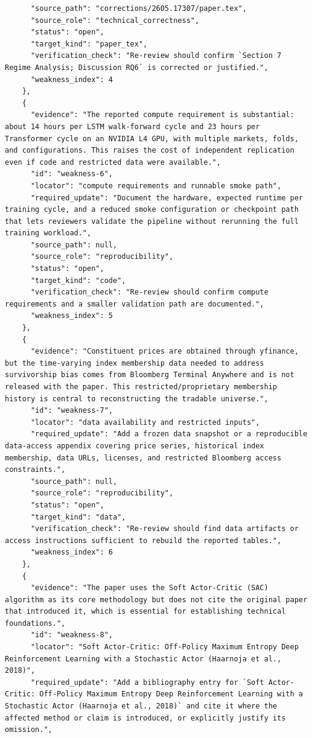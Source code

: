 \documentclass[11pt]{article}
\begin{document}
\begin{verbatim}
      "source_path": "corrections/2605.17307/paper.tex",
      "source_role": "technical_correctness",
      "status": "open",
      "target_kind": "paper_tex",
      "verification_check": "Re-review should confirm `Section 7 Regime Analysis; Discussion RQ6` is corrected or justified.",
      "weakness_index": 4
    },
    {
      "evidence": "The reported compute requirement is substantial: about 14 hours per LSTM walk-forward cycle and 23 hours per Transformer cycle on an NVIDIA L4 GPU, with multiple markets, folds, and configurations. This raises the cost of independent replication even if code and restricted data were available.",
      "id": "weakness-6",
      "locator": "compute requirements and runnable smoke path",
      "required_update": "Document the hardware, expected runtime per training cycle, and a reduced smoke configuration or checkpoint path that lets reviewers validate the pipeline without rerunning the full training workload.",
      "source_path": null,
      "source_role": "reproducibility",
      "status": "open",
      "target_kind": "code",
      "verification_check": "Re-review should confirm compute requirements and a smaller validation path are documented.",
      "weakness_index": 5
    },
    {
      "evidence": "Constituent prices are obtained through yfinance, but the time-varying index membership data needed to address survivorship bias comes from Bloomberg Terminal Anywhere and is not released with the paper. This restricted/proprietary membership history is central to reconstructing the tradable universe.",
      "id": "weakness-7",
      "locator": "data availability and restricted inputs",
      "required_update": "Add a frozen data snapshot or a reproducible data-access appendix covering price series, historical index membership, data URLs, licenses, and restricted Bloomberg access constraints.",
      "source_path": null,
      "source_role": "reproducibility",
      "status": "open",
      "target_kind": "data",
      "verification_check": "Re-review should find data artifacts or access instructions sufficient to rebuild the reported tables.",
      "weakness_index": 6
    },
    {
      "evidence": "The paper uses the Soft Actor-Critic (SAC) algorithm as its core methodology but does not cite the original paper that introduced it, which is essential for establishing technical foundations.",
      "id": "weakness-8",
      "locator": "Soft Actor-Critic: Off-Policy Maximum Entropy Deep Reinforcement Learning with a Stochastic Actor (Haarnoja et al., 2018)",
      "required_update": "Add a bibliography entry for `Soft Actor-Critic: Off-Policy Maximum Entropy Deep Reinforcement Learning with a Stochastic Actor (Haarnoja et al., 2018)` and cite it where the affected method or claim is introduced, or explicitly justify its omission.",

\end{verbatim}
\end{document}
